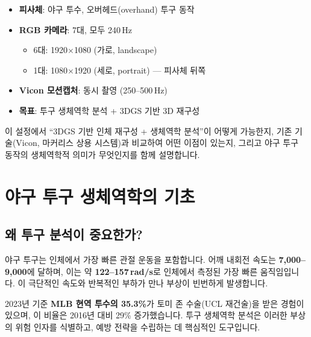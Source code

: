 \documentclass[11pt, a4paper]{report}
\begin{document}
\begin{setupbox}[title={실험 세팅}]
\begin{itemize}[leftmargin=*]
  \item \textbf{피사체}: 야구 투수, 오버헤드(overhand) 투구 동작
  \item \textbf{RGB 카메라}: 7대, 모두 240\,Hz
  \begin{itemize}
    \item 6대: 1920$\times$1080 (가로, landscape)
    \item 1대: 1080$\times$1920 (세로, portrait) --- 피사체 뒤쪽
  \end{itemize}
  \item \textbf{Vicon 모션캡처}: 동시 촬영 (250--500\,Hz)
  \item \textbf{목표}: 투구 생체역학 분석 + 3DGS 기반 3D 재구성
\end{itemize}
\end{setupbox}

이 설정에서 ``3DGS 기반 인체 재구성 + 생체역학 분석''이 어떻게 가능한지, 기존 기술(Vicon, 마커리스 상용 시스템)과 비교하여 어떤 이점이 있는지, 그리고 야구 투구 동작의 생체역학적 의미가 무엇인지를 함께 설명합니다.


\chapter{야구 투구 생체역학의 기초}
\label{ch:pitching_biomech}

\section{왜 투구 분석이 중요한가?}

야구 투구는 인체에서 가장 빠른 관절 운동을 포함합니다. 어깨 내회전 속도는 \textbf{7,000--9,000\degps}에 달하며, 이는 약 \textbf{122--157\,rad/s}로 인체에서 측정된 가장 빠른 움직임입니다. 이 극단적인 속도와 반복적인 부하가 만나 부상이 빈번하게 발생합니다.

\begin{injurybox}
2023년 기준 \textbf{MLB 현역 투수의 35.3\%}가 토미 존 수술(UCL 재건술)을 받은 경험이 있으며, 이 비율은 2016년 대비 29\% 증가했습니다. 투구 생체역학 분석은 이러한 부상의 위험 인자를 식별하고, 예방 전략을 수립하는 데 핵심적인 도구입니다.
\end{injurybox}
\end{document}
